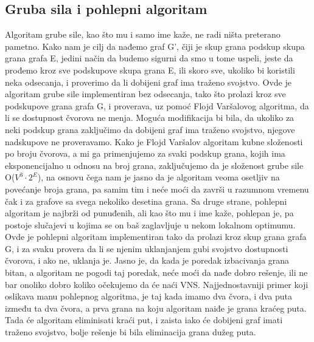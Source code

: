 \documentclass{article}
\begin{document}
\subsection{\huge Gruba sila i pohlepni algoritam}\label{sec:gspa}
Algoritam grube sile, kao što mu i samo ime kaže, ne radi ništa preterano pametno. Kako nam je cilj da nađemo graf G', čiji je skup grana podskup skupa grana grafa E, jedini način da budemo sigurni da smo u tome uspeli, jeste da prođemo kroz sve podskupove skupa grana E, ili skoro sve, ukoliko bi koristili neka odsecanja, i proverimo da li dobijeni graf ima traženo svojstvo.
\newline
Ovde je algoritam grube sile implementiran bez odsecanja, tako što prolazi kroz sve podskupove grana grafa G, i proverava, uz pomoć Flojd Varšalovog algoritma, da li se dostupnost čvorova ne menja.
\newline
Moguća modifikacija bi bila, da ukoliko za neki podskup grana zaključimo da dobijeni graf ima traženo svojstvo, njegove nadskupove ne proveravamo.
\newline
Kako je Flojd Varšalov algoritam kubne složenosti po broju čvorova, a mi ga primenjujemo za svaki podskup grana, kojih ima eksponencijalno u odnosu na broj grana, zaključujemo da je složenost grube sile O($V^3 \cdot 2^E$), na osnovu čega nam je jasno da je algoritam veoma osetljiv na povećanje broja grana, pa samim tim i neće moći da završi u razumnom vremenu čak i za grafove sa svega nekoliko desetina grana.
\newline
\newline
Sa druge strane, pohlepni algoritam je najbrži od punuđenih, ali kao što mu i ime kaže, pohlepan je, pa postoje slučajevi u kojima se on baš zaglavljuje u nekom lokalnom optimumu.
\newline
Ovde je pohlepni algoritam implementiran tako da prolazi kroz skup grana grafa G, i za svaku provera da li se njenim uklanjanjem gubi svojstvo dostupnosti čvorova, i ako ne, uklanja je. 
\newline
Jasno je, da kada je poredak izbacivanja grana bitan, a algoritam ne pogodi taj poredak, neće moći da nađe dobro rešenje, ili ne bar onoliko dobro koliko očekujemo da će naći VNS. Najjednostavniji primer koji oslikava manu pohlepnog algoritma, je taj kada imamo dva čvora, i dva puta između ta dva čvora, a prva grana na koju algoritam naiđe je grana kraćeg puta. Tada će algoritam eliminisati kraći put, i zaista iako će dobijeni graf imati traženo svojstvo, bolje rešenje bi bila eliminacija grana dužeg puta.
\end{document}
